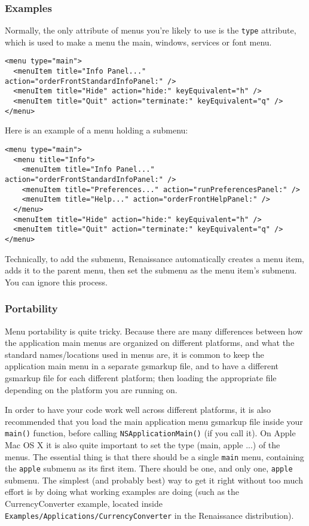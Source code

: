 \subsubsection{Examples}
Normally, the only attribute of menus you're likely to use is the 
\texttt{type} attribute, which is used to make a menu the main, windows, 
services or font menu.
\begin{verbatim}
<menu type="main">
  <menuItem title="Info Panel..." action="orderFrontStandardInfoPanel:" />
  <menuItem title="Hide" action="hide:" keyEquivalent="h" />
  <menuItem title="Quit" action="terminate:" keyEquivalent="q" />
</menu>
\end{verbatim}

Here is an example of a menu holding a submenu:
\begin{verbatim}
<menu type="main">
  <menu title="Info">
    <menuItem title="Info Panel..." action="orderFrontStandardInfoPanel:" />
    <menuItem title="Preferences..." action="runPreferencesPanel:" />
    <menuItem title="Help..." action="orderFrontHelpPanel:" />
  </menu>
  <menuItem title="Hide" action="hide:" keyEquivalent="h" />
  <menuItem title="Quit" action="terminate:" keyEquivalent="q" />
</menu>
\end{verbatim}
Technically, to add the submenu, Renaissance automatically creates a
menu item, adds it to the parent menu, then set the submenu as the
menu item's submenu.  You can ignore this process.

\subsubsection{Portability}
Menu portability is quite tricky.  Because there are many differences
between how the application main menus are organized on different
platforms, and what the standard names/locations used in menus are, it
is common to keep the application main menu in a separate gsmarkup
file, and to have a different gsmarkup file for each different
platform; then loading the appropriate file depending on the platform
you are running on.

In order to have your code work well across different platforms, it is
also recommended that you load the main application menu gsmarkup file
inside your \texttt{main()} function, before calling
\texttt{NSApplicationMain()} (if you call it).  On Apple Mac OS X it is
also quite important to set the type (main, apple ...)  of the menus.
The essential thing is that there should be a single \texttt{main}
menu, containing the \texttt{apple} submenu as its first item.  There
should be one, and only one, \texttt{apple} submenu.  The simplest
(and probably best) way to get it right without too much effort is by
doing what working examples are doing (such as the CurrencyConverter
example, located inside
\texttt{Examples/Applications/CurrencyConverter} in the Renaissance
distribution).

